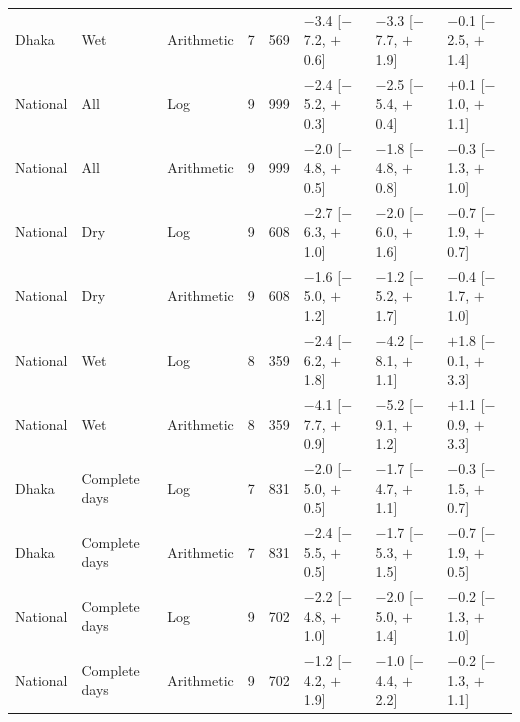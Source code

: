 \begin{longtable}{L{1.4cm} L{1.5cm} L{1.5cm} C{0.4cm} C{1.0cm} C{2.4cm} C{2.4cm} C{2.4cm}}
Dhaka & Wet & Arithmetic & 7 & 569 & $-$3.4 {\scriptsize[$-$7.2, $+$0.6]} & $-$3.3 {\scriptsize[$-$7.7, $+$1.9]} & $-$0.1 {\scriptsize[$-$2.5, $+$1.4]} \\
National & All & Log & 9 & 999 & $-$2.4 {\scriptsize[$-$5.2, $+$0.3]} & $-$2.5 {\scriptsize[$-$5.4, $+$0.4]} & $+$0.1 {\scriptsize[$-$1.0, $+$1.1]} \\
National & All & Arithmetic & 9 & 999 & $-$2.0 {\scriptsize[$-$4.8, $+$0.5]} & $-$1.8 {\scriptsize[$-$4.8, $+$0.8]} & $-$0.3 {\scriptsize[$-$1.3, $+$1.0]} \\
National & Dry & Log & 9 & 608 & $-$2.7 {\scriptsize[$-$6.3, $+$1.0]} & $-$2.0 {\scriptsize[$-$6.0, $+$1.6]} & $-$0.7 {\scriptsize[$-$1.9, $+$0.7]} \\
National & Dry & Arithmetic & 9 & 608 & $-$1.6 {\scriptsize[$-$5.0, $+$1.2]} & $-$1.2 {\scriptsize[$-$5.2, $+$1.7]} & $-$0.4 {\scriptsize[$-$1.7, $+$1.0]} \\
National & Wet & Log & 8 & 359 & $-$2.4 {\scriptsize[$-$6.2, $+$1.8]} & $-$4.2 {\scriptsize[$-$8.1, $+$1.1]} & $+$1.8 {\scriptsize[$-$0.1, $+$3.3]} \\
National & Wet & Arithmetic & 8 & 359 & $-$4.1 {\scriptsize[$-$7.7, $+$0.9]} & $-$5.2 {\scriptsize[$-$9.1, $+$1.2]} & $+$1.1 {\scriptsize[$-$0.9, $+$3.3]} \\
Dhaka & Complete days & Log & 7 & 831 & $-$2.0 {\scriptsize[$-$5.0, $+$0.5]} & $-$1.7 {\scriptsize[$-$4.7, $+$1.1]} & $-$0.3 {\scriptsize[$-$1.5, $+$0.7]} \\
Dhaka & Complete days & Arithmetic & 7 & 831 & $-$2.4 {\scriptsize[$-$5.5, $+$0.5]} & $-$1.7 {\scriptsize[$-$5.3, $+$1.5]} & $-$0.7 {\scriptsize[$-$1.9, $+$0.5]} \\
National & Complete days & Log & 9 & 702 & $-$2.2 {\scriptsize[$-$4.8, $+$1.0]} & $-$2.0 {\scriptsize[$-$5.0, $+$1.4]} & $-$0.2 {\scriptsize[$-$1.3, $+$1.0]} \\
National & Complete days & Arithmetic & 9 & 702 & $-$1.2 {\scriptsize[$-$4.2, $+$1.9]} & $-$1.0 {\scriptsize[$-$4.4, $+$2.2]} & $-$0.2 {\scriptsize[$-$1.3, $+$1.1]} \\
\end{longtable}
\endgroup

